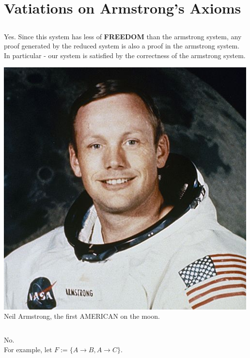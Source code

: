 \section{Vatiations on Armstrong's Axioms}
\subsection{}
Yes. Since this system has less of \textbf{FREEDOM} than the armstrong system,
any proof generated by the reduced system is also a proof in the armstrong system.\\
In particular - our system is satisfied by the correctness of the armstrong system.

\begin{center}
	\includegraphics[width=0.8 \textwidth]{armstrong.jpg}\centering\\
	Neil Armstrong, the first AMERICAN on the moon.
\end{center}

\subsection{}
No.\\
For example, let $F:=\{A\rightarrow B, A\rightarrow C\}$.\\

